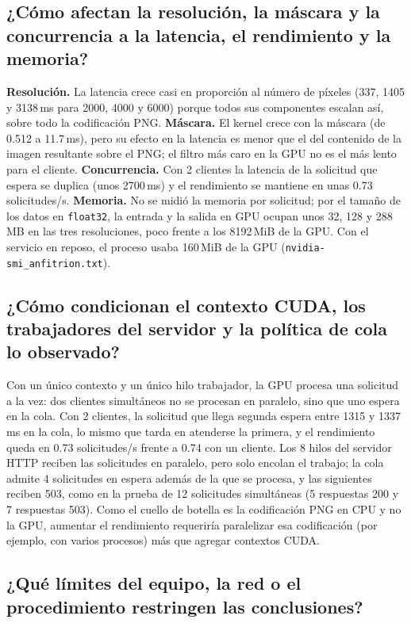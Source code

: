 \documentclass[12pt]{article}
\begin{document}
\subsection{¿Cómo afectan la resolución, la máscara y la concurrencia a la latencia, el rendimiento y la memoria?}

\textbf{Resolución.} La latencia crece casi en proporción al número de píxeles (337, 1405 y
3138\,ms para 2000, 4000 y 6000) porque todos sus componentes escalan así, sobre todo la codificación
PNG. \textbf{Máscara.} El kernel crece con la máscara (de 0.512 a 11.7\,ms), pero su efecto en la
latencia es menor que el del contenido de la imagen resultante sobre el PNG; el filtro más caro en la
GPU no es el más lento para el cliente. \textbf{Concurrencia.} Con 2 clientes la latencia de la
solicitud que espera se duplica (unos 2700\,ms) y el rendimiento se mantiene en unas 0.73
solicitudes/s. \textbf{Memoria.} No se midió la memoria por solicitud; por el tamaño de los datos en
\texttt{float32}, la entrada y la salida en GPU ocupan unos 32, 128 y 288\,MB en las tres
resoluciones, poco frente a los 8192\,MiB de la GPU. Con el servicio en reposo, el proceso usaba
160\,MiB de la GPU (\texttt{nvidia-smi\_anfitrion.txt}).

\subsection{¿Cómo condicionan el contexto CUDA, los trabajadores del servidor y la política de cola lo observado?}

Con un único contexto y un único hilo trabajador, la GPU procesa una solicitud a la vez: dos clientes
simultáneos no se procesan en paralelo, sino que uno espera en la cola. Con 2 clientes, la solicitud que llega
segunda espera entre 1315 y 1337\,ms en la cola, lo mismo que tarda en atenderse la primera, y el
rendimiento queda en 0.73 solicitudes/s frente a 0.74 con un cliente. Los 8 hilos del servidor HTTP
reciben las solicitudes en paralelo, pero solo encolan el trabajo; la cola admite 4 solicitudes en
espera además de la que se procesa, y las siguientes reciben 503, como en la prueba de 12 solicitudes
simultáneas (5 respuestas 200 y 7 respuestas 503). Como el cuello de botella es la codificación PNG en
CPU y no la GPU, aumentar el rendimiento requeriría paralelizar esa codificación (por ejemplo, con
varios procesos) más que agregar contextos CUDA.

\subsection{¿Qué límites del equipo, la red o el procedimiento restringen las conclusiones?}
\end{document}
